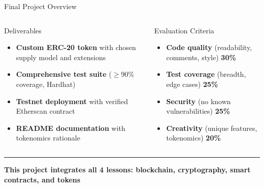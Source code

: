 \documentclass[8pt,aspectratio=169]{beamer}
\newcommand{\bottomnote}[1]{\vfill\vspace{-2mm}\textcolor{mllavender2}{\rule{\textwidth}{0.4pt}}\vspace{1mm}\footnotesize\textbf{#1}}
\begin{document}
\begin{frame}{Final Project Overview}
  \begin{columns}[T]
      \begin{block}{Deliverables}
        \begin{itemize}\setlength\itemsep{4pt}
          \item[\textcolor{mlblue}{\textbullet}]
            \textbf{Custom ERC-20 token} with chosen supply model and extensions
          \item[\textcolor{mlblue}{\textbullet}]
            \textbf{Comprehensive test suite} (\(\geq\)90\% coverage, Hardhat)
          \item[\textcolor{mlblue}{\textbullet}]
            \textbf{Testnet deployment} with verified Etherscan contract
          \item[\textcolor{mlblue}{\textbullet}]
            \textbf{README documentation} with tokenomics rationale
        \end{itemize}
      \end{block}

      \begin{block}{Evaluation Criteria}
        \begin{itemize}\setlength\itemsep{3pt}
          \scriptsize
          \item[\textcolor{mlblue}{\textbullet}]
            \textbf{Code quality} (readability, comments, style) \hfill \textbf{30\%}
          \item[\textcolor{mlgreen}{\textbullet}]
            \textbf{Test coverage} (breadth, edge cases) \hfill \textbf{25\%}
          \item[\textcolor{mlred}{\textbullet}]
            \textbf{Security} (no known vulnerabilities) \hfill \textbf{25\%}
          \item[\textcolor{mlorange}{\textbullet}]
            \textbf{Creativity} (unique features, tokenomics) \hfill \textbf{20\%}
        \end{itemize}
      \end{block}
  \end{columns}
  \bottomnote{This project integrates all 4 lessons: blockchain, cryptography, smart contracts, and tokens}
\end{frame}
\end{document}
